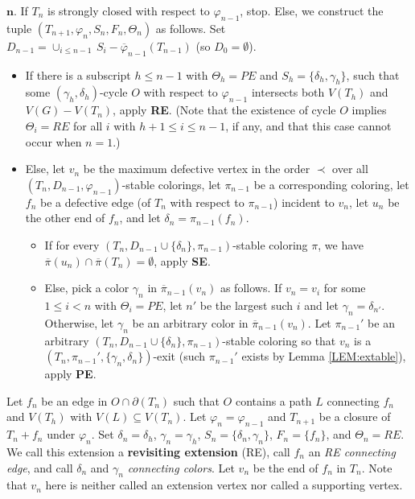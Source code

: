 \documentclass[11pt]{article}
\newcommand{\phibar}{\overline{\varphi}}
\newcommand{\phiv}{\varphi}
\begin{document}
 ${\bm n}$. If $T_n$ is strongly closed with respect to $\phiv_{n-1}$, stop. Else, we construct the tuple 
$(T_{n+1}, \phiv_n, S_n, F_n, \Theta_n)$ as follows. Set $D_{n-1}=\cup_{i \le n-1} \, S_i - \phibar_{n-1}(T_{n-1})$ (so $D_0=\emptyset$).
\begin{itemize}
	
	\vspace{-2mm}	
	\item If there is a subscript $h \le n-1$ with $\Theta_h =PE$ and $S_h =\{\delta_h, \gamma_h\}$, such that 
	some $(\gamma_h, \delta_h)$-cycle $O$ with respect to $\phiv_{n-1}$ intersects both $V(T_h)$ and $V(G)-V(T_n)$, 
	apply {\bf RE}. (Note that the existence of cycle $O$ implies $\Theta_i=RE$ for all $i$ with $h+1 \le i \le n-1$, if any, and that
	this case cannot occur when $n=1$.)
	\vspace{-2mm}	
	\item Else, let $v_n$ be the maximum defective vertex\label{maximumdefective} in the order $\prec$ over all
	$(T_n, D_{n-1}, \phiv_{n-1})$-stable colorings, let $\pi_{n-1}$ be a corresponding coloring, let $f_n$ be a defective edge (of $T_n$ with respect to $\pi_{n-1}$)
	incident to $v_n$, 	let $u_n$ be the other end of $f_n$, and let $\delta_n=\pi_{n-1}(f_n)$. 
	\begin{itemize}
		\vspace{-2mm}	
		\item If for every $(T_n, D_{n-1}\cup\{\delta_n\}, \pi_{n-1})$-stable coloring $\pi$,  we have $\overline{\pi}(u_n) \cap \overline{\pi} 
		(T_n)=\emptyset$, apply {\bf SE}.
		\item Else, pick a color $\gamma_n$ in $\overline{\pi}_{n-1}(v_n)$ as follows. If $v_n=v_i$ for some $1\leq i<n$ with $\Theta_i={PE}$, let $n'$ be the 
		largest such $i$ and let $\gamma_n=\delta_{n'}$. Otherwise, let $\gamma_n$ be an arbitrary color in $\overline{\pi}_{n-1}(v_n)$.  Let $\pi_{n-1}'$ be an arbitrary
		$(T_n, D_{n-1}\cup\{\delta_n\}, \pi_{n-1})$-stable coloring so that $v_n$ is a $(T_n, \pi_{n-1}', \{\gamma_n, \delta_n\})$-exit (such $\pi_{n-1}'$ exists 
		by Lemma \ref{LEM:extable}), apply {\bf PE}. 
		
	\end{itemize}
\end{itemize}

\label{REextension} Let $f_n$ be an  edge in $O \cap \partial(T_n)$ such that $O$ contains a path $L$
connecting $f_n$ and $V(T_h)$ with $V(L) \subseteq V(T_n)$. Let $\phiv_n = \phiv_{n-1}$ and $T_{n+1}$ be a closure of 
$T_n+f_n$ under $\phiv_{n}$.  Set $\delta_n=\delta_h$, $\gamma_n=\gamma_h$, $S_n=\{\delta_n,\gamma_n\}$, $F_n = \{ f_n\}$, and $\Theta_n = RE$. 
We call this extension a {\bf revisiting extension} (RE), call $f_n$ an {\em RE connecting edge}\label{connectingedge}, and call $\delta_n$ and $\gamma_n$ 
{\em connecting colors}\label{connectingcolor}. Let $v_n$ be the end of $f_n$ in $T_n$. Note that $v_n$ here is neither called an extension vertex nor called a supporting vertex. 
\end{document}
